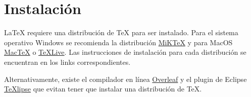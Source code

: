 \section{Instalación}
\LaTeX{} requiere una distribución de \TeX{} para ser instalado. Para el sistema operativo Windows se recomienda la distribución \href{https://www.miktex.org/}{MiKTeX} y para MacOS \href{https://www.tug.org/mactex/}{MacTeX} o \href{https://www.tug.org/texlive/}{TeXLive}. Las instrucciones de instalación para cada distribución se encuentran en los links correspondientes.

Alternativamente, existe el compilador en línea \href{https://www.overleaf.com}{Overleaf} y el plugin de Eclipse \href{https://texlipse.sourceforge.net/}{TeXlipse} que evitan tener que instalar una distribución de \TeX{}.
